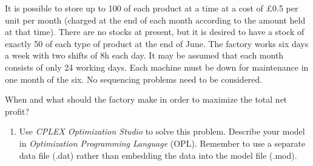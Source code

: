 \documentclass[12pt,a4paper]{article}
\theoremstyle{definition}
\begin{document}
\begin{enumerate}
	It is possible to store up to 100 of each product at a time at a cost of \pounds0.5 per unit per month (charged at the end of each month according to the amount held at that time). There are no stocks at present, but it is desired to have a stock of exactly 50 of each type of product at the end of June. The factory works six days a week with two shifts of 8h each day. It may be assumed that each month consists of only 24 working days. Each machine must be down for maintenance in one month of the six. No sequencing problems need to be considered.
	
	When and what should the factory make in order to maximize the total net profit?
	
	\begin{enumerate}
		\item
		Use \emph{CPLEX Optimization Studio} to solve this problem. Describe your model in \emph{Optimization Programming Language} (OPL). Remember to use a separate data file (.dat) rather than embedding the data into the model file (.mod).
		

\end{enumerate}
\end{enumerate}
\end{document}
